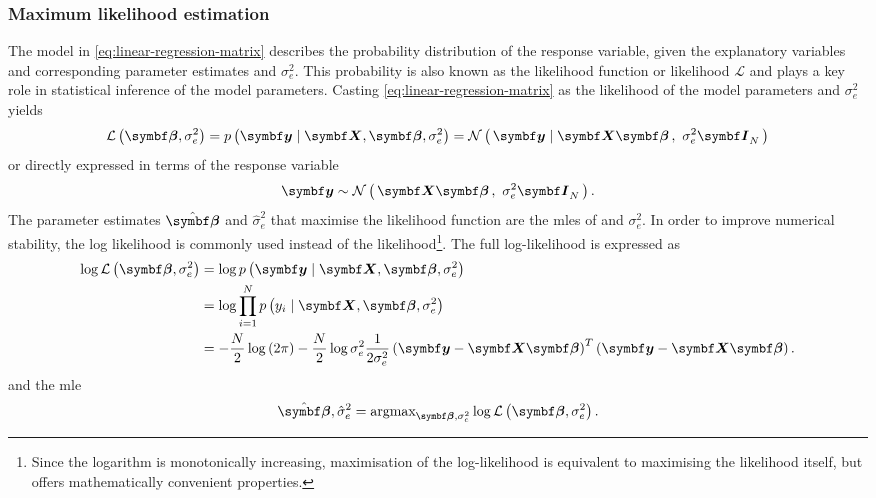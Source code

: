 \subsubsection{Maximum likelihood estimation}
The model in \cref{eq:linear-regression-matrix} describes the probability distribution of the response variable, given the explanatory variables and corresponding parameter estimates \tmat{\beta} and \(\sigma^2_e\). This probability is also known as the likelihood function or likelihood \(\mathcal{L}\) and plays a key role in statistical inference of the model parameters. Casting \cref{eq:linear-regression-matrix} as the likelihood of the model parameters  \tmat{\beta} and \(\sigma^2_e\) yields 
\begin{equation}
\mathcal{L} \left( \mat{\beta}, \sigma^2_e \right) = p \left(\mat{y} \mid \mat{X}, \mat{\beta}, \sigma^2_e \right) = \normal {\mat{y} \mid \mat{X}\mat{\beta}} {\sigma^2_e\matsub{I}{N}}
\end{equation}
%
or directly expressed in terms of the response variable
\begin{equation}
\label{eq:normal-matrix}
\mat{y} \sim \normal {\mat{X}\mat{\beta}} {\sigma^2_e\matsub{I}{N}}.
\end{equation}
%
The parameter estimates \(\hat{\mat{\beta}}\) and \(\hat{\sigma}^2_e\) that maximise the likelihood function are the \glspl{mle} of \tmat{\beta} and \(\sigma^2_e\). In order to improve numerical stability, the log likelihood is commonly used instead of the likelihood\footnote{Since the logarithm is monotonically increasing, maximisation of the log-likelihood is equivalent to maximising the likelihood itself, but offers mathematically convenient properties.}. The full log-likelihood is expressed as
%
\begin{align}
\log\mathcal{L} \left( \mat{\beta}, \sigma^2_e \right) & = \log p \left(\mat{y} \mid \mat{X}, \mat{\beta}, \sigma^2_e \right) \\
& = \log \prod^N_{i=1} p \left(y_i \mid \mat{X}, \mat{\beta}, \sigma^2_e \right) \\
& =  -\frac{N}{2}\log\left(2\pi\right) - \frac{N}{2}\log\sigma^2_e  \frac{1}{2\sigma^2_e } \left(\mat{y} - \mat{X}\mat{\beta}\right)^T  \left(\mat{y} - \mat{X}\mat{\beta}\right).
\label{eq:log-likelihood}
\end{align}
%
and the \gls{mle}
%
\begin{equation}
\hat{\mat{\beta}},\hat{\sigma}^2_e = \text{argmax}_{\mat{\beta},\sigma^2_e} \log\mathcal{L}\left(\mat{\beta},\sigma^2_e\right).
\label{eq:argmax-log}
\end{equation}

